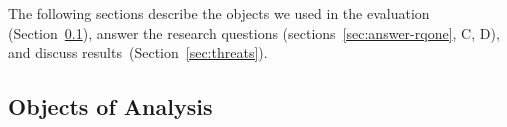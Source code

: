 \documentclass[conference]{IEEEtran}
\begin{document}
The following sections describe the objects we used in the evaluation
(Section~\ref{sec:dataset-benign}), answer the research questions
(sections~\ref{sec:answer-rqone}, C, D), and discuss
results~(Section~\ref{sec:threats}).



\subsection{Objects of Analysis}
\label{sec:dataset-benign}
\label{attack-reproduction}
\label{subsec:malicious-traffic}
\label{sec:objectanalysis-benign}

\end{document}
